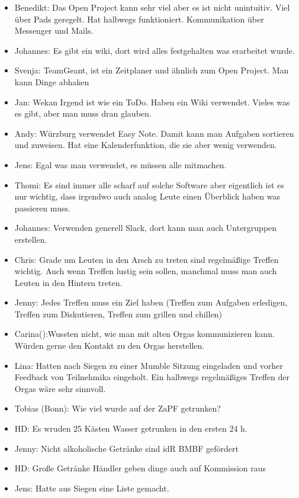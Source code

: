 \begin{itemize}
      \item Benedikt: Das Open Project kann sehr viel aber es ist nicht unintuitiv. Viel über Pads geregelt. Hat halbwegs funktioniert. Kommunikation über Messenger und Mails.
      \item Johannes: Es gibt ein wiki, dort wird alles festgehalten was erarbeitet wurde.
      \item Svenja: TeamGeant, ist ein Zeitplaner und ähnlich zum Open Project. Man kann Dinge abhaken
      \item Jan: Wekan Irgend ist wie ein ToDo. Haben ein Wiki verwendet. Vieles was es gibt, aber man muss dran glauben.
      \item Andy: Würzburg verwendet Easy Note. Damit kann man Aufgaben sortieren und zuweisen. Hat eine Kalenderfunktion, die sie aber wenig verwenden.
      \item Jens: Egal was man verwendet, es müssen alle mitmachen.
      \item Thomi: Es sind immer alle scharf auf solche Software aber eigentlich ist es nur wichtig, dass irgendwo auch analog Leute einen Überblick haben was passieren muss.
      \item Johannes: Verwenden generell Slack, dort kann man auch Untergruppen erstellen.
      \item Chris: Grade um Leuten in den Arsch zu treten sind regelmäßige Treffen wichtig. Auch wenn Treffen lustig sein sollen, manchmal muss man auch Leuten in den Hintern treten.
      \item Jenny: Jedes Treffen muss ein Ziel haben (Treffen zum Aufgaben erledigen, Treffen zum Diskutieren, Treffen zum grillen und chillen)
      \item Carina():Wussten nicht, wie man mit alten Orgas kommunizieren kann. Würden gerne den Kontakt zu den Orgas herstellen.
      \item Lina: Hatten nach Siegen zu einer Mumble Sitzung eingeladen und vorher Feedback von Teilnehmika eingeholt. Ein halbwegs regelmäßiges Treffen der Orgas wäre sehr sinnvoll.
      \item Tobias (Bonn): Wie viel wurde auf der ZaPF getrunken?
      \item HD: Es wruden 25 Kästen Wasser getrunken in den ersten 24 h.
      \item Jenny: Nicht alkoholische Getränke sind idR BMBF gefördert
      \item HD: Große Getränke Händler geben dinge auch auf Kommission raus
      \item Jens: Hatte aus Siegen eine Liste gemacht.

\end{itemize}
